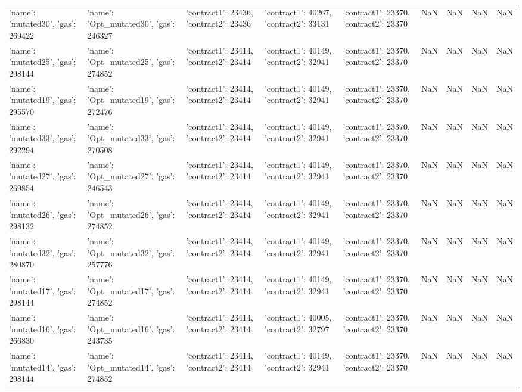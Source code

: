 \begin{tabular}{lllllllll}
{'name': 'mutated30', 'gas': 269422} & {'name': 'Opt_mutated30', 'gas': 246327} & {'contract1': 23436, 'contract2': 23436} & {'contract1': 40267, 'contract2': 33131} & {'contract1': 23370, 'contract2': 23370} & NaN & NaN & NaN & NaN \\
{'name': 'mutated25', 'gas': 298144} & {'name': 'Opt_mutated25', 'gas': 274852} & {'contract1': 23414, 'contract2': 23414} & {'contract1': 40149, 'contract2': 32941} & {'contract1': 23370, 'contract2': 23370} & NaN & NaN & NaN & NaN \\
{'name': 'mutated19', 'gas': 295570} & {'name': 'Opt_mutated19', 'gas': 272476} & {'contract1': 23414, 'contract2': 23414} & {'contract1': 40149, 'contract2': 32941} & {'contract1': 23370, 'contract2': 23370} & NaN & NaN & NaN & NaN \\
{'name': 'mutated33', 'gas': 292294} & {'name': 'Opt_mutated33', 'gas': 270508} & {'contract1': 23414, 'contract2': 23414} & {'contract1': 40149, 'contract2': 32941} & {'contract1': 23370, 'contract2': 23370} & NaN & NaN & NaN & NaN \\
{'name': 'mutated27', 'gas': 269854} & {'name': 'Opt_mutated27', 'gas': 246543} & {'contract1': 23414, 'contract2': 23414} & {'contract1': 40149, 'contract2': 32941} & {'contract1': 23370, 'contract2': 23370} & NaN & NaN & NaN & NaN \\
{'name': 'mutated26', 'gas': 298132} & {'name': 'Opt_mutated26', 'gas': 274852} & {'contract1': 23414, 'contract2': 23414} & {'contract1': 40149, 'contract2': 32941} & {'contract1': 23370, 'contract2': 23370} & NaN & NaN & NaN & NaN \\
{'name': 'mutated32', 'gas': 280870} & {'name': 'Opt_mutated32', 'gas': 257776} & {'contract1': 23414, 'contract2': 23414} & {'contract1': 40149, 'contract2': 32941} & {'contract1': 23370, 'contract2': 23370} & NaN & NaN & NaN & NaN \\
{'name': 'mutated17', 'gas': 298144} & {'name': 'Opt_mutated17', 'gas': 274852} & {'contract1': 23414, 'contract2': 23414} & {'contract1': 40149, 'contract2': 32941} & {'contract1': 23370, 'contract2': 23370} & NaN & NaN & NaN & NaN \\
{'name': 'mutated16', 'gas': 266830} & {'name': 'Opt_mutated16', 'gas': 243735} & {'contract1': 23414, 'contract2': 23414} & {'contract1': 40005, 'contract2': 32797} & {'contract1': 23370, 'contract2': 23370} & NaN & NaN & NaN & NaN \\
{'name': 'mutated14', 'gas': 298144} & {'name': 'Opt_mutated14', 'gas': 274852} & {'contract1': 23414, 'contract2': 23414} & {'contract1': 40149, 'contract2': 32941} & {'contract1': 23370, 'contract2': 23370} & NaN & NaN & NaN & NaN \\

\end{tabular}
